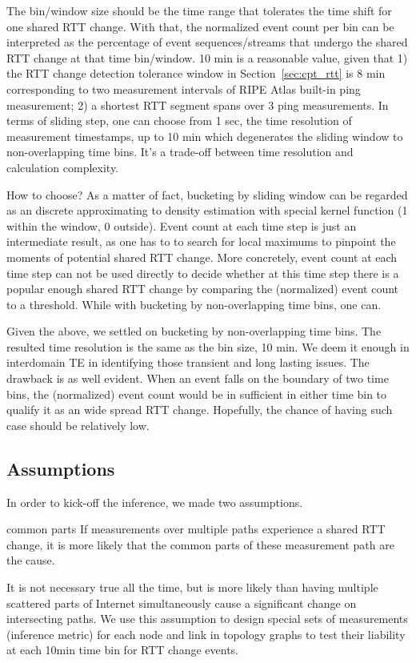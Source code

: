 The bin/window size should be the time range that tolerates the time shift for one shared RTT change. With that, the normalized event count per bin can be interpreted as the percentage of event sequences/streams that undergo the shared RTT change at that time bin/window. 
10 min is a reasonable value, given that 1) the RTT change detection tolerance window in Section~\ref{sec:cpt_rtt} is 8 min corresponding to two measurement intervals of RIPE Atlas built-in ping measurement; 2) a shortest RTT segment spans over 3 ping measurements.
In terms of sliding step, one can choose from 1 sec, the time resolution of measurement timestamps, up to 10 min which degenerates the sliding window to non-overlapping time bins. It's a trade-off between time resolution and calculation complexity.

How to choose? As a matter of fact, bucketing by sliding window can be regarded as an discrete approximating to density estimation with special kernel function (1 within the window, 0 outside). Event count at each time step is just an intermediate result, as one has to to search for local maximums to pinpoint the moments of potential shared RTT change.
More concretely, event count at each time step can not be used directly to decide whether at this time step there is a popular enough shared RTT change by comparing the (normalized) event count to a threshold. While with bucketing by non-overlapping time bins, one can.

Given the above, we settled on bucketing by non-overlapping time bins. The resulted time resolution is the same as the bin size, 10 min. We deem it enough in interdomain TE in identifying those transient and long lasting issues. The drawback is as well evident. When an event falls on the boundary of two time bins, the (normalized) event count would be in sufficient in either time bin to qualify it as an wide spread RTT change. Hopefully, the chance of having such case should be relatively low.

\subsection{Assumptions}
In order to kick-off the inference, we made two assumptions.

\begin{assumption}{1}{common parts}\label{as:1}
If measurements over multiple paths experience a shared RTT change, it is more likely that the common parts of these measurement path are the cause.
\end{assumption}
It is not necessary true all the time, but is more likely than having multiple scattered parts of Internet simultaneously cause a significant change on intersecting paths. We use this assumption to design special sets of measurements (inference metric) for each node and link in topology graphs to test their liability at each 10min time bin for RTT change events.

